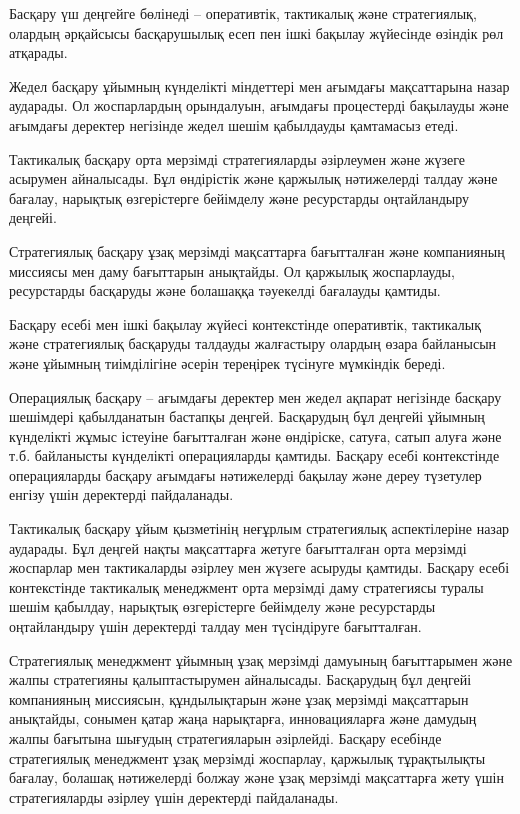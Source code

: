 \begin{multicols}{2}
Басқару үш деңгейге бөлінеді -- оперативтік, тактикалық және
стратегиялық, олардың әрқайсысы басқарушылық есеп пен ішкі бақылау
жүйесінде өзіндік рөл атқарады.

Жедел басқару ұйымның күнделікті міндеттері мен ағымдағы мақсаттарына
назар аударады. Ол жоспарлардың орындалуын, ағымдағы процестерді
бақылауды және ағымдағы деректер негізінде жедел шешім қабылдауды
қамтамасыз етеді.

Тактикалық басқару орта мерзімді стратегияларды әзірлеумен және жүзеге
асырумен айналысады. Бұл өндірістік және қаржылық нәтижелерді талдау
және бағалау, нарықтық өзгерістерге бейімделу және ресурстарды
оңтайландыру деңгейі.

Стратегиялық басқару ұзақ мерзімді мақсаттарға бағытталған және
компанияның миссиясы мен даму бағыттарын анықтайды. Ол қаржылық
жоспарлауды, ресурстарды басқаруды және болашаққа тәуекелді бағалауды
қамтиды.

Басқару есебі мен ішкі бақылау жүйесі контекстінде оперативтік,
тактикалық және стратегиялық басқаруды талдауды жалғастыру олардың өзара
байланысын және ұйымның тиімділігіне әсерін тереңірек түсінуге мүмкіндік
береді.

Операциялық басқару -- ағымдағы деректер мен жедел ақпарат негізінде
басқару шешімдері қабылданатын бастапқы деңгей. Басқарудың бұл деңгейі
ұйымның күнделікті жұмыс істеуіне бағытталған және өндіріске, сатуға,
сатып алуға және т.б. байланысты күнделікті операцияларды қамтиды.
Басқару есебі контекстінде операцияларды басқару ағымдағы нәтижелерді
бақылау және дереу түзетулер енгізу үшін деректерді пайдаланады.

Тактикалық басқару ұйым қызметінің неғұрлым стратегиялық аспектілеріне
назар аударады. Бұл деңгей нақты мақсаттарға жетуге бағытталған орта
мерзімді жоспарлар мен тактикаларды әзірлеу мен жүзеге асыруды қамтиды.
Басқару есебі контекстінде тактикалық менеджмент орта мерзімді даму
стратегиясы туралы шешім қабылдау, нарықтық өзгерістерге бейімделу және
ресурстарды оңтайландыру үшін деректерді талдау мен түсіндіруге
бағытталған.

Стратегиялық менеджмент ұйымның ұзақ мерзімді дамуының бағыттарымен және
жалпы стратегияны қалыптастырумен айналысады. Басқарудың бұл деңгейі
компанияның миссиясын, құндылықтарын және ұзақ мерзімді мақсаттарын
анықтайды, сонымен қатар жаңа нарықтарға, инновацияларға және дамудың
жалпы бағытына шығудың стратегияларын әзірлейді. Басқару есебінде
стратегиялық менеджмент ұзақ мерзімді жоспарлау, қаржылық тұрақтылықты
бағалау, болашақ нәтижелерді болжау және ұзақ мерзімді мақсаттарға жету
үшін стратегияларды әзірлеу үшін деректерді пайдаланады.


\end{multicols}
